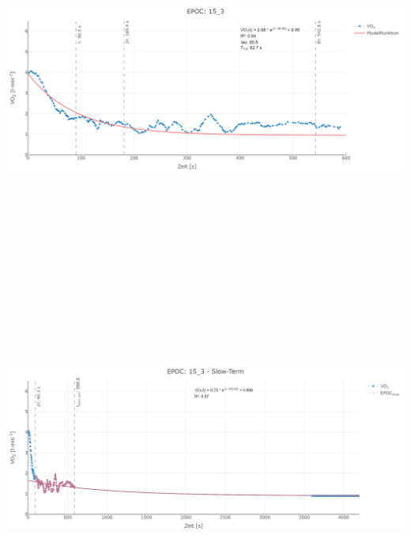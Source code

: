 \documentclass[
  letterpaper,
  DIV=11]{scrartcl}
\begin{document}
\includegraphics[width=11.45833in,height=4.6875in]{images/15_3_tau.png}
\includegraphics[width=11.45833in,height=4.6875in]{images/15_3_slow.png}
\end{document}
